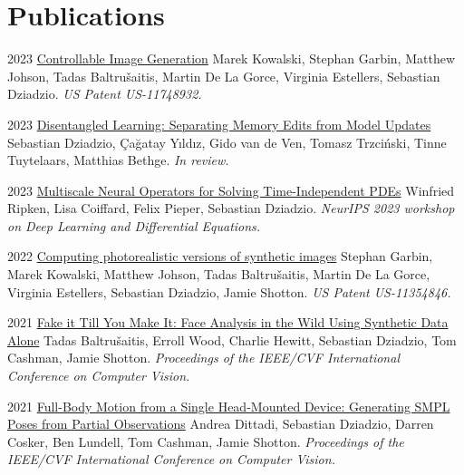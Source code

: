 \documentclass[]{friggeri-cv_osx}
\begin{document}
\section{Publications}
\begin{entrylist}

\entry
{2023}
{\href{https://scholar.google.com/citations?user=8vAIQXoAAAAJ&hl=en}{Controllable Image Generation}}
{}
{Marek Kowalski, Stephan Garbin, Matthew Johson, Tadas Baltru\v{s}aitis, Martin De La Gorce, Virginia Estellers, Sebastian Dziadzio.
\textit{US Patent US-11748932.}\\}

\entry
{2023}
{\href{https://scholar.google.com/citations?user=8vAIQXoAAAAJ&hl=en}{Disentangled Learning: Separating Memory Edits from Model Updates}}
{}
{Sebastian Dziadzio, Çağatay Yıldız, Gido van de Ven, Tomasz Trzciński, Tinne Tuytelaars, Matthias Bethge.
\textit{In review.}\\}

\entry
{2023}
{\href{https://scholar.google.com/citations?user=8vAIQXoAAAAJ&hl=en}{Multiscale Neural Operators for Solving Time-Independent PDEs}}
{}
{Winfried Ripken, Lisa Coiffard, Felix Pieper, Sebastian Dziadzio.
\textit{NeurIPS 2023 workshop on Deep Learning and Differential Equations.}\\}

\entry
{2022}
{\href{https://scholar.google.com/citations?user=8vAIQXoAAAAJ&hl=en}{Computing photorealistic versions of synthetic images}}
{}
{Stephan Garbin, Marek Kowalski, Matthew Johson, Tadas Baltru\v{s}aitis, Martin De La Gorce, Virginia Estellers, Sebastian Dziadzio, Jamie Shotton.
\textit{US Patent US-11354846.}\\}

\entry
{2021}
{\href{https://scholar.google.com/citations?user=8vAIQXoAAAAJ&hl=en}{Fake it Till You Make It: Face Analysis in the Wild Using Synthetic Data Alone}}
{}
{Tadas Baltru\v{s}aitis, Erroll Wood, Charlie Hewitt, Sebastian Dziadzio, Tom Cashman, Jamie Shotton.
\textit{Proceedings of the IEEE/CVF International Conference on Computer Vision.}\\}

\entry
{2021}
{\href{https://scholar.google.com/citations?user=8vAIQXoAAAAJ&hl=en}{Full-Body Motion from a Single Head-Mounted Device: Generating SMPL Poses from Partial Observations}}
{}
{Andrea Dittadi, Sebastian Dziadzio, Darren Cosker, Ben Lundell, Tom Cashman, Jamie Shotton.
\textit{Proceedings of the IEEE/CVF International Conference on Computer Vision.}\\}
\end{entrylist}
\end{document}

